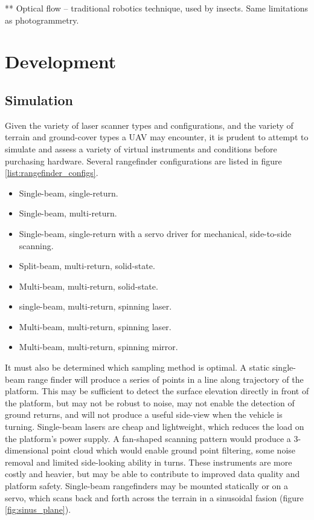 \documentclass[10pt,a4paper]{report}
\begin{document}
** Optical flow -- traditional robotics technique, used by insects. Same limitations as photogrammetry.


\section{Development}


\subsection{Simulation}

Given the variety of laser scanner types and configurations, and the variety of terrain and ground-cover types a UAV may encounter, it is prudent to attempt to simulate and assess a variety of virtual instruments and conditions before purchasing hardware. Several rangefinder configurations are listed in figure \ref{list:rangefinder_configs}.

\begin{itemize}
\item Single-beam, single-return.
\item Single-beam, multi-return.
\item Single-beam, single-return with a servo driver for mechanical, side-to-side scanning.
\item Split-beam, multi-return, solid-state.
\item Multi-beam, multi-return, solid-state.
\item single-beam, multi-return, spinning laser.
\item Multi-beam, multi-return, spinning laser.
\item Multi-beam, multi-return, spinning mirror.
\label{list:rangefinder_configs}
\end{itemize}

It must also be determined which sampling method is optimal. A static single-beam range finder will produce a series of points in a line along trajectory of the platform. This may be sufficient to detect the surface elevation directly in front of the platform, but may not be robust to noise, may not enable the detection of ground returns, and will not produce a useful side-view when the vehicle is turning. Single-beam lasers are cheap and lightweight, which reduces the load on the platform's power supply. A fan-shaped scanning pattern would produce a 3-dimensional point cloud which would enable ground point filtering, some noise removal and limited side-looking ability in turns. These instruments are more costly and heavier, but may be able to contribute to improved data quality and platform safety. Single-beam rangefinders may be mounted statically or on a servo, which scans back and forth across the terrain in a sinusoidal fasion (figure \ref{fig:sinus_plane}).
\end{document}

